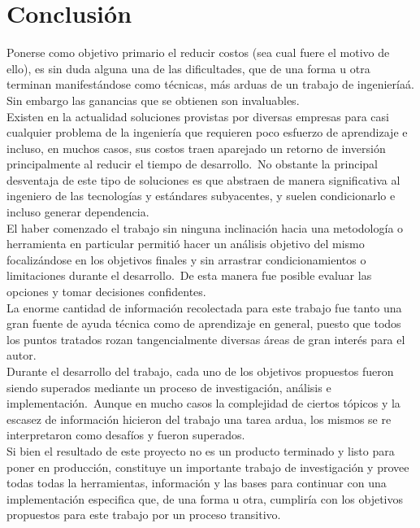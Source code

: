 \chapter{Conclusi\'on}

Ponerse como objetivo primario el reducir costos (sea cual fuere el motivo de
ello), es sin duda alguna una de las dificultades, que de una forma u otra
terminan manifest\'andose como t\'ecnicas, m\'as arduas de un trabajo de
ingenier\'ia\'a. Sin embargo las ganancias que se obtienen son invaluables.\\

Existen en la actualidad soluciones provistas por diversas empresas para casi
cualquier problema de la ingenier\'ia que requieren poco esfuerzo de
aprendizaje e incluso, en muchos casos, sus costos traen aparejado un retorno
de inversi\'on principalmente al reducir el tiempo de desarrollo.\
No obstante la principal desventaja de este tipo de soluciones es que abstraen
de manera significativa al ingeniero de las tecnolog\'ias y est\'andares
subyacentes, y suelen condicionarlo e incluso generar dependencia.\\

El haber comenzado el trabajo sin ninguna inclinaci\'on hacia una metodolog\'ia
o herramienta en particular permiti\'o hacer un an\'alisis objetivo del mismo
focaliz\'andose en los objetivos finales y sin arrastrar condicionamientos
o limitaciones durante el desarrollo.\ 
De esta manera fue posible evaluar las opciones y tomar decisiones
confidentes.\\

La enorme cantidad de informaci\'on recolectada para este trabajo fue tanto una
gran fuente de ayuda t\'ecnica como de aprendizaje en general, puesto que
todos los puntos tratados rozan tangencialmente diversas \'areas de gran
inter\'es para el autor.\\

Durante el desarrollo del trabajo, cada uno de los objetivos propuestos fueron
siendo superados mediante un proceso de investigaci\'on, an\'alisis e
implementaci\'on.\
Aunque en mucho casos la complejidad de ciertos t\'opicos y la escasez de
informaci\'on hicieron del trabajo una tarea ardua, los mismos se re
interpretaron como desaf\'ios y fueron superados.\\

Si bien el resultado de este proyecto no es un producto terminado y listo para
poner en producci\'on, constituye un importante trabajo de investigaci\'on y
provee todas todas la herramientas, informaci\'on y las bases para continuar
con una implementaci\'on especifica que, de una forma u otra, cumplir\'ia con
los objetivos propuestos para este trabajo por un proceso transitivo.


